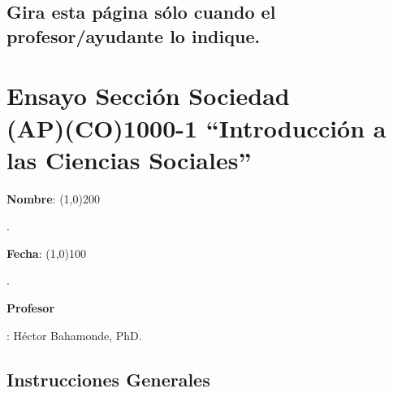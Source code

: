 \documentclass{article}
\begin{document}
\subsection*{Gira esta p\'agina s\'olo cuando el profesor/ayudante lo indique.}

\clearpage
\newpage

{\centering\section*{Ensayo Secci\'on Sociedad\\(AP)(CO)1000-1 ``Introducci\'on a las Ciencias Sociales''}}

{\vspace{.5cm}\raggedright{\bf Nombre}: \line(1,0){200}}. %
{\vspace{.5cm}\hspace{4.5cm}\raggedright{\bf Fecha}: \line(1,0){100}}. %


{\vspace{.5cm}\raggedright \bf Profesor}: H\'ector Bahamonde, PhD.\\


\vspace{0.5cm}\subsection*{Instrucciones Generales}
\end{document}
